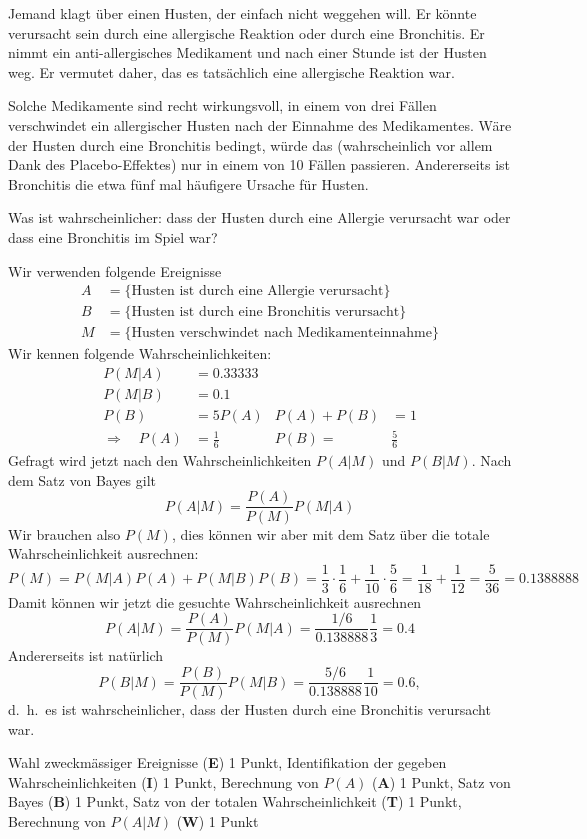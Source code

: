 %
%
Jemand klagt über einen Husten, der einfach nicht weggehen will.
Er könnte verursacht sein durch eine allergische Reaktion oder durch
eine Bronchitis. Er nimmt ein anti-allergisches Medikament und
nach einer Stunde ist der Husten weg. Er vermutet daher, das es tatsächlich
eine allergische Reaktion war.

Solche Medikamente sind recht wirkungsvoll, in einem von drei Fällen
verschwindet ein allergischer Husten nach der Einnahme des Medikamentes.
Wäre der Husten durch eine Bronchitis bedingt, würde das (wahrscheinlich
vor allem Dank des Placebo-Effektes) nur in einem von 10 Fällen passieren.
Andererseits ist Bronchitis die etwa fünf mal häufigere Ursache für
Husten.

Was ist wahrscheinlicher: dass der Husten durch eine Allergie verursacht
war oder dass eine Bronchitis im Spiel war?


\begin{loesung}
Wir verwenden folgende Ereignisse
\begin{align*}
A&=\{\text{Husten ist durch eine Allergie verursacht}\}
\\
B&=\{\text{Husten ist durch eine Bronchitis verursacht}\}
\\
M&=\{\text{Husten verschwindet nach Medikamenteinnahme}\}
\end{align*}
Wir kennen folgende Wahrscheinlichkeiten:
\begin{align*}
P(M|A)&=0.33333\\
P(M|B)&=0.1\\
P(B)&=5P(A)&P(A)+P(B)&=1\\
\Rightarrow\quad P(A)&=\frac16&P(B)=&\frac56
\end{align*}
Gefragt wird jetzt nach den Wahrscheinlichkeiten $P(A|M)$ und $P(B|M)$.
Nach dem Satz von Bayes gilt
\[
P(A|M)=\frac{P(A)}{P(M)}P(M|A)
\]
Wir brauchen also $P(M)$, dies können wir aber mit dem Satz
über die totale Wahrscheinlichkeit ausrechnen:
\[
P(M)
=
P(M|A)P(A)+P(M|B)P(B)
=
\frac13\cdot\frac16+\frac1{10}\cdot\frac56
=
\frac1{18}+\frac1{12}=\frac{5}{36}
=
0.1388888
\]
Damit können wir jetzt die gesuchte Wahrscheinlichkeit ausrechnen
\[
P(A|M)
=
\frac{P(A)}{P(M)}P(M|A)
=
\frac{1/6}{0.138888}\frac13
=
0.4
\]
Andererseits ist natürlich
\[
P(B|M)
=
\frac{P(B)}{P(M)}P(M|B)
=
\frac{5/6}{0.138888}\frac1{10}
=
0.6,
\]
d.~h.~es ist wahrscheinlicher, dass der Husten durch eine Bronchitis
verursacht war.
\end{loesung}


\begin{bewertung}
Wahl zweckmässiger Ereignisse ({\bf E}) 1 Punkt,
Identifikation der gegeben Wahrscheinlichkeiten ({\bf I}) 1 Punkt,
Berechnung von $P(A)$ ({\bf A}) 1 Punkt,
Satz von Bayes ({\bf B}) 1 Punkt,
Satz von der totalen Wahrscheinlichkeit ({\bf T}) 1 Punkt,
Berechnung von $P(A|M)$ ({\bf W}) 1 Punkt
\end{bewertung}


